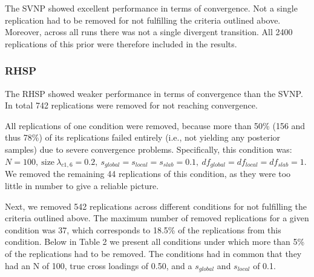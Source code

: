 \documentclass[
  man, donotrepeattitle,floatsintext]{apa6}
\begin{document}
The SVNP showed excellent performance in terms of convergence. Not a
single replication had to be removed for not fulfilling the criteria
outlined above. Moreover, across all runs there was not a single
divergent transition. All 2400 replications of this prior were therefore
included in the results.

\hypertarget{rhsp}{%
\subsubsection{RHSP}\label{rhsp}}

The RHSP showed weaker performance in terms of convergence than the
SVNP. In total 742 replications were removed for not reaching
convergence.

All replications of one condition were removed, because more than 50\%
(156 and thus 78\%) of its replications failed entirely (i.e., not
yielding any posterior samples) due to severe convergence problems.
Specifically, this condition was:
\(N = 100, \ \text{size} \ \lambda_{c1,6} = 0.2, \ s_{global} = s_{local} = s_{slab} = 0.1, \ df_{global} = df_{local} = df_{slab} = 1\).
We removed the remaining 44 replications of this condition, as they were
too little in number to give a reliable picture.

Next, we removed 542 replications across different conditions for not
fulfilling the criteria outlined above. The maximum number of removed
replications for a given condition was 37, which corresponds to 18.5\% of
the replications from this condition. Below in Table 2 we present all
conditions under which more than 5\% of the replications had to be
removed. The conditions had in common that they had an N of 100, true
cross loadings of 0.50, and a \(s_{global}\) and \(s_{local}\) of 0.1.
\end{document}
